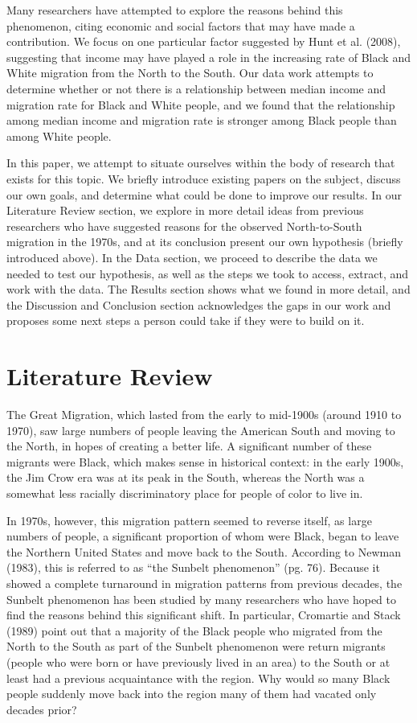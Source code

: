 \documentclass[12pt]{article}
\begin{document}
Many researchers have attempted to explore the reasons behind this phenomenon, citing economic and social factors that may have made a contribution. We focus on one particular factor suggested by Hunt et al. (2008), suggesting that income may have played a role in the increasing rate of Black and White migration from the North to the South. Our data work attempts to determine whether or not there is a relationship between median income and migration rate for Black and White people, and we found that the relationship among median income and migration rate is stronger among Black people than among White people. 

In this paper, we attempt to situate ourselves within the body of research that exists for this topic. We briefly introduce existing papers on the subject, discuss our own goals, and determine what could be done to improve our results. In our Literature Review section, we explore in more detail ideas from previous researchers who have suggested reasons for the observed North-to-South migration in the 1970s, and at its conclusion present our own hypothesis (briefly introduced above). In the Data section, we proceed to describe the data we needed to test our hypothesis, as well as the steps we took to access, extract, and work with the data. The Results section shows what we found in more detail, and the Discussion and Conclusion section acknowledges the gaps in our work and proposes some next steps a person could take if they were to build on it.

\section{Literature Review}
\label{sec:literature}

The Great Migration, which lasted from the early to mid-1900s (around 1910 to 1970), saw large numbers of people leaving the American South and moving to the North, in hopes of creating a better life. A significant number of these migrants were Black, which makes sense in historical context: in the early 1900s, the Jim Crow era was at its peak in the South, whereas the North was a somewhat less racially discriminatory place for people of color to live in. 

In 1970s, however, this migration pattern seemed to reverse itself, as large numbers of people, a significant proportion of whom were Black, began to leave the Northern United States and move back to the South. According to Newman (1983), this is referred to as “the Sunbelt phenomenon” (pg. 76). Because it showed a complete turnaround in migration patterns from previous decades, the Sunbelt phenomenon has been studied by many researchers who have hoped to find the reasons behind this significant shift. In particular, Cromartie and Stack (1989) point out that a majority of the Black people who migrated from the North to the South as part of the Sunbelt phenomenon were return migrants (people who were born or have previously lived in an area) to the South or at least had a previous acquaintance with the region. Why would so many Black people suddenly move back into the region many of them had vacated only decades prior? 
\end{document}
